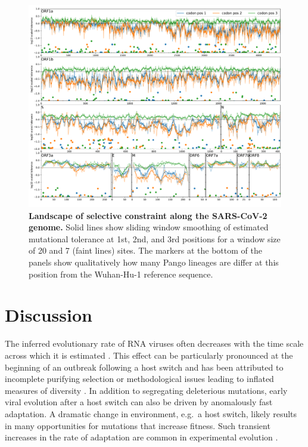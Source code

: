\documentclass[aps,rmp, twocolumn]{revtex4}
\begin{document}
 \begin{figure}[tb]
    \includegraphics[width=\textwidth]{figures/fitness_landscape.pdf}
    \caption{{\bf Landscape of selective constraint along the SARS-CoV-2 genome.}
    Solid lines show sliding window smoothing of estimated mutational tolerance at 1st, 2nd, and 3rd positions for a window size of 20 and 7 (faint lines) sites.
    The markers at the bottom of the panels show qualitatively how many Pango lineages are differ at this position from the Wuhan-Hu-1 reference sequence.
    \label{fig:fitness_landscape}}
 \end{figure}

\section*{Discussion}
The inferred evolutionary rate of RNA viruses often decreases with the time scale across which it is estimated \citep{wertheim_purifying_2011,ghafari_prisoner_2021}.
This effect can be particularly pronounced at the beginning of an outbreak following a host switch and has been attributed to incomplete purifying selection or methodological issues leading to inflated measures of diversity \citep{meyer_time_2015,ghafari_purifying_2022}.
In addition to segregating deleterious mutations, early viral evolution after a host switch can also be driven by anomalously fast adaptation.
A dramatic change in environment, e.g.~a host switch, likely results in many opportunities for mutations that increase fitness.
Such transient increases in the rate of adaptation are common in experimental evolution \citep{elena_virus_2007}.
\end{document}
